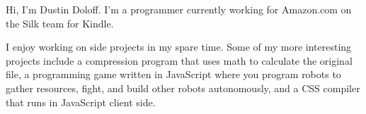 Hi, I'm Dustin Doloff. I'm a programmer currently working for Amazon.com on the Silk team for Kindle.

I enjoy working on side projects in my spare time. Some of my more interesting projects include a compression program that uses math to calculate the original file, a programming game written in JavaScript where you program robots to gather resources, fight, and build other robots autonomously, and a CSS compiler that runs in JavaScript client side.
